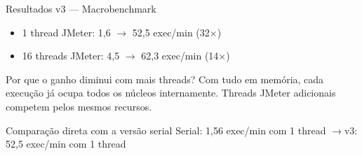 \begin{frame}{Resultados v3 --- Macrobenchmark}
    \begin{itemize}
        \item 1 thread JMeter: 1,6 $\to$ \alert{52,5 exec/min} (\alert{32$\times$})
        \item 16 threads JMeter: 4,5 $\to$ \alert{62,3 exec/min} (\alert{14$\times$})
    \end{itemize}

    \vspace{0.8em}
    \begin{block}{Por que o ganho diminui com mais threads?}
        Com tudo em memória, cada execução já ocupa todos os núcleos internamente.
        Threads JMeter adicionais competem pelos mesmos recursos.
    \end{block}

    \vspace{0.5em}
    \begin{alertblock}{Comparação direta com a versão serial}
        Serial: 1,56 exec/min com 1 thread \quad$\to$\quad v3: 52,5 exec/min com 1 thread
    \end{alertblock}
\end{frame}
